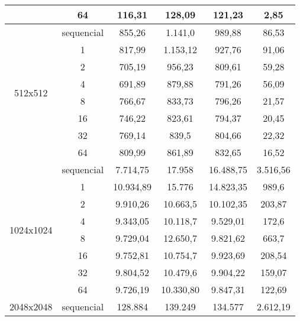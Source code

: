 \begin{table}[!h]
\begin{tabular}{|c|c|cccc|}
		& 64                                &  116,31    &   128,09   &    121,23    &      2,85         \\ \hline
		\multirow{8}{*}{512x512}      & sequencial     &  855,26    & 1.141,0     & 989,88       &     86,53           \\
		& 1                                 &   817,99   &  1.153,12    &   927,76     &  91,06              \\
		& 2                                 &  705,19    &    956,23  &   809,61     &   59,28             \\
		& 4                                 &   691,89   &  879,88    &     791,26   &     56,09           \\
		& 8                                 &    766,67  &  833,73    &   796,26     &     21,57           \\
		& 16                                &   746,22   &  823,61    &    794,37    &        20,45        \\
		& 32                                &    769,14  &    839,5  &  804,66      &      22,32          \\
		& 64                                &    809,99  &    861,89  &    832,65    &         16,52      \\ \hline
		\multirow{8}{*}{1024x1024}      & sequencial   & 7.714,75     &   17.958   &  16.488,75      &  3.516,56              \\
		& 1            &   10.934,89   & 15.776       &   14.823,35 & 989,6             \\
		& 2                                 &   9.910,26   &   10.663,5   &     10.102,35   &   203,87             \\
		& 4                                 &  9.343,05    & 10.118,7     &   9.529,01     &       172,6         \\
		& 8                                 &  9.729,04    &   12.650,7   &   9.821,62     &         663,7       \\
		& 16                                &  9.752,81    &  10.754,7    &     9.923,69   &      208,54          \\
		& 32                                &   9.804,52   &  10.479,6    &     9.904,22   &     159,07           \\
		& 64                                &    9.726,19  &  10.330,80    &    9.847,31    &     122,69          \\ \hline
		\multirow{8}{*}{2048x2048}      & sequencial   &    128.884  &  139.249    &  134.577      &    2.612,19            \\

\end{tabular}
\end{table}
